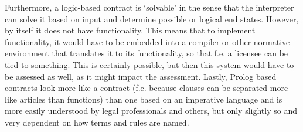 \documentclass{article}
\begin{document}
Furthermore, a logic-based contract is ‘solvable’ in the sense that the interpreter can solve it based on input and determine possible or logical end states. However, by itself it does not have functionality. This means that to implement functionality, it would have to be embedded into a compiler or other normative environment that translates it to its functionality, so that f.e. a licensee can be tied to something. This is certainly possible, but then this system would have to be assessed as well, as it might impact the assessment. Lastly, Prolog based contracts look more like a contract (f.e. because clauses can be separated more like articles than functions) than one based on an imperative language and is more easily understood by legal professionals and others, but only slightly so and very dependent on how terms and rules are named.%
\end{document}
